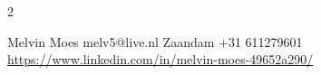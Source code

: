 \documentclass[lighthipster]{simplehipstercv}
\newlength{\rightcolwidth}
\newlength{\leftcolwidth}
\begin{document}
\begin{paracol}{2}
        \bigskip
        \bigskip



        \vfill{} %

        \setlength{\parindent}{0pt}
        \begin{minipage}[t]{\leftcolwidth}
        \end{minipage}%
        \begin{minipage}[t]{\rightcolwidth}
        \begin{center}\fontfamily{\sfdefault}\selectfont \color{black!70}
        {\small Melvin Moes  melv5@live.nl  Zaandam  +31 611279601} \\
         \url{https://www.linkedin.com/in/melvin-moes-49652a290/}
        \end{center}
        \end{minipage}
    \end{paracol}
\end{document}
